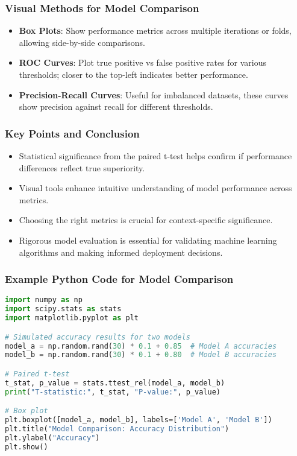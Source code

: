 \documentclass[aspectratio=169]{beamer}
\begin{document}
\begin{frame}
    \frametitle{Visual Methods for Model Comparison}
    \begin{itemize}
        \item \textbf{Box Plots}: Show performance metrics across multiple iterations or folds, allowing side-by-side comparisons.
        \item \textbf{ROC Curves}: Plot true positive vs false positive rates for various thresholds; closer to the top-left indicates better performance.
        \item \textbf{Precision-Recall Curves}: Useful for imbalanced datasets, these curves show precision against recall for different thresholds.
    \end{itemize}
\end{frame}

\begin{frame}
    \frametitle{Key Points and Conclusion}
    \begin{itemize}
        \item Statistical significance from the paired t-test helps confirm if performance differences reflect true superiority.
        \item Visual tools enhance intuitive understanding of model performance across metrics.
        \item Choosing the right metrics is crucial for context-specific significance.
        \item Rigorous model evaluation is essential for validating machine learning algorithms and making informed deployment decisions.
    \end{itemize}
\end{frame}

\begin{frame}[fragile]
    \frametitle{Example Python Code for Model Comparison}
    \begin{lstlisting}[language=Python]
import numpy as np
import scipy.stats as stats
import matplotlib.pyplot as plt

# Simulated accuracy results for two models
model_a = np.random.rand(30) * 0.1 + 0.85  # Model A accuracies
model_b = np.random.rand(30) * 0.1 + 0.80  # Model B accuracies

# Paired t-test
t_stat, p_value = stats.ttest_rel(model_a, model_b)
print("T-statistic:", t_stat, "P-value:", p_value)

# Box plot
plt.boxplot([model_a, model_b], labels=['Model A', 'Model B'])
plt.title("Model Comparison: Accuracy Distribution")
plt.ylabel("Accuracy")
plt.show()
    \end{lstlisting}
\end{frame}
\end{document}
